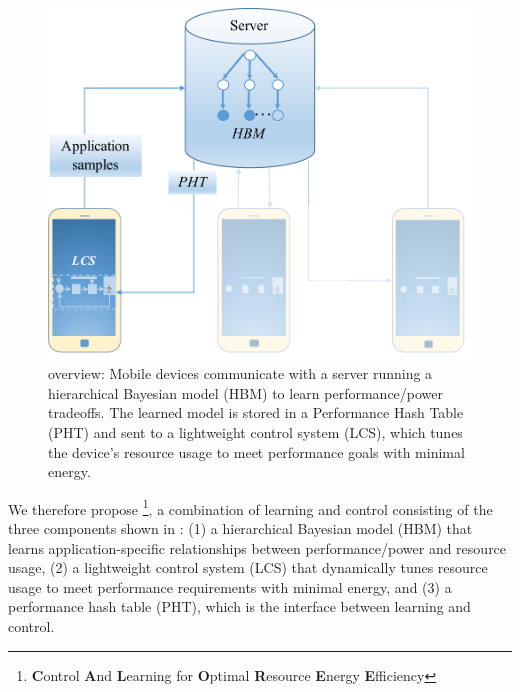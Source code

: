 {\begin{figure}
\includegraphics[width=\columnwidth]{figures/mobile-leo-poet2.pdf}
\caption{\SYSTEM{} overview: Mobile devices communicate with a server
  running a hierarchical Bayesian model (HBM) to learn
  performance/power tradeoffs.  The learned model is stored in a
  Performance Hash Table (PHT) and sent to a lightweight control
  system (LCS), which tunes the device's resource usage to meet
  performance goals with minimal energy. }
  \label{fig:overview}
\end{figure}
We therefore propose \SYSTEM{}\footnote{\textbf{C}ontrol \textbf{A}nd
  \textbf{L}earning for \textbf{O}ptimal \textbf{R}esource
  \textbf{E}nergy \textbf{E}fficiency}, a combination of learning and
control consisting of the three components shown in
: (1) a hierarchical Bayesian model (HBM) that
learns application-specific relationships between performance/power
and resource usage, (2) a lightweight control system (LCS) that
dynamically tunes resource usage to meet performance requirements with
minimal energy, and (3) a performance hash table (PHT), which is the
interface between learning and control.

}

